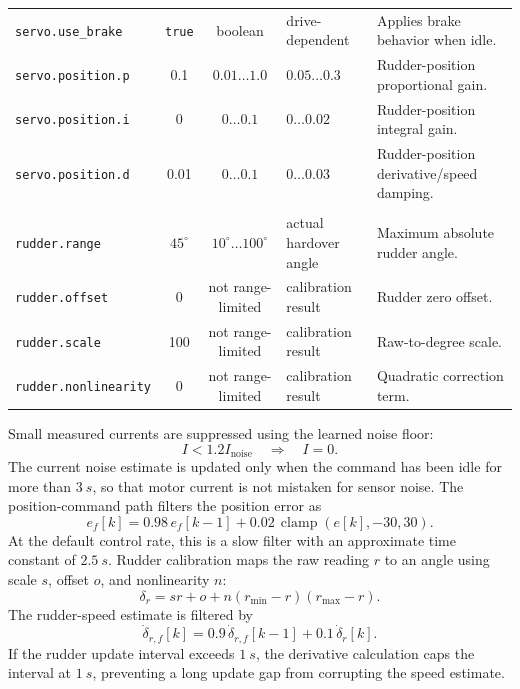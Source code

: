 \documentclass[10pt,twocolumn]{article}
\begin{document}
\begin{table}[!tbp]
\begin{tabularx}{\textwidth}{Z{0.23\textwidth}c c Z{0.16\textwidth}Y}
\texttt{servo.use\_brake} & \texttt{true} & boolean & drive-dependent & Applies brake behavior when idle. \\
\texttt{servo.position.p} & \num{0.1} & \(\num{0.01}\ldots\num{1.0}\) & \(\num{0.05}\ldots\num{0.3}\) & Rudder-position proportional gain. \\
\texttt{servo.position.i} & \num{0} & \(\num{0}\ldots\num{0.1}\) & \(\num{0}\ldots\num{0.02}\) & Rudder-position integral gain. \\
\texttt{servo.position.d} & \num{0.01} & \(\num{0}\ldots\num{0.1}\) & \(\num{0}\ldots\num{0.03}\) & Rudder-position derivative/speed damping. \\
\addlinespace[0.6ex]
 \\
\addlinespace[0.25ex]
\texttt{rudder.range} & \(45^\circ\) & \(10^\circ\ldots100^\circ\) & actual hardover angle & Maximum absolute rudder angle. \\
\texttt{rudder.offset} & \num{0} & not range-limited & calibration result & Rudder zero offset. \\
\texttt{rudder.scale} & \num{100} & not range-limited & calibration result & Raw-to-degree scale. \\
\texttt{rudder.nonlinearity} & \num{0} & not range-limited & calibration result & Quadratic correction term. \\
\bottomrule
\end{tabularx}
\end{table}
Small measured currents are suppressed using the learned noise floor:
\[
I < 1.2 I_{\mathrm{noise}}
\quad\Longrightarrow\quad
I=0.
\]
The current noise estimate is updated only when the command has been idle
for more than \(\SI{3}{s}\), so that motor current is not mistaken for
sensor noise.
The position-command path filters the position error as
\[
e_f[k]
=
0.98\,e_f[k-1]
+
0.02\,\operatorname{clamp}(e[k],-30,30).
\]
At the default control rate, this is a slow filter with an approximate
time constant of \(\SI{2.5}{s}\).  Rudder calibration maps the raw reading
\(r\) to an angle using scale \(s\), offset \(o\), and nonlinearity \(n\):
\[
\delta_r
=
s r
+
o
+
n(r_{\min}-r)(r_{\max}-r).
\]
The rudder-speed estimate is filtered by
\[
\dot{\delta}_{r,f}[k]
=
0.9\,\dot{\delta}_{r,f}[k-1]
+
0.1\,\dot{\delta}_{r}[k].
\]
If the rudder update interval exceeds \(\SI{1}{s}\), the derivative
calculation caps the interval at \(\SI{1}{s}\), preventing a long update
gap from corrupting the speed estimate.
\end{document}
